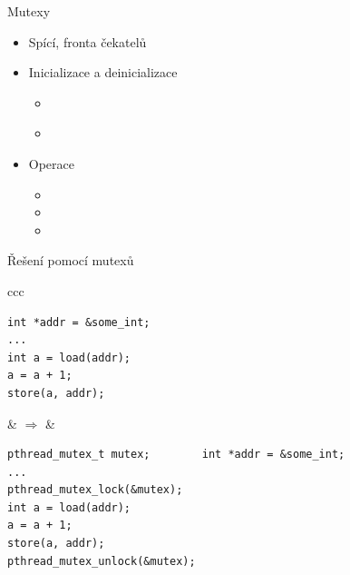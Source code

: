 \begin{frame}[fragile]{Mutexy}

  \begin{itemize}
    \item Spící, fronta čekatelů

    \pause

    \item Inicializace a deinicializace 
    \begin{itemize}
      \item { } \\
	{  }
      \item {}
    \end{itemize}

    \pause

    \item Operace
    \begin{itemize}
      \item {}
      \item {}
      \item {}
    \end{itemize}

  \end{itemize}

  \pause

  \begin{block}{Řešení pomocí mutexů}
    \begin{center}
      \begin{tabular}{ccc}
	\begin{lstlisting}[aboveskip=2pt,belowskip=2pt]
int *addr = &some_int;
...
int a = load(addr);
a = a + 1;
store(a, addr);
	\end{lstlisting} & $\Rightarrow$ &
	\begin{lstlisting}
pthread_mutex_t mutex;        int *addr = &some_int;
...
pthread_mutex_lock(&mutex);
int a = load(addr);
a = a + 1;
store(a, addr);
pthread_mutex_unlock(&mutex);
	\end{lstlisting}
      \end{tabular}
    \end{center}
  \end{block}

\end{frame}

